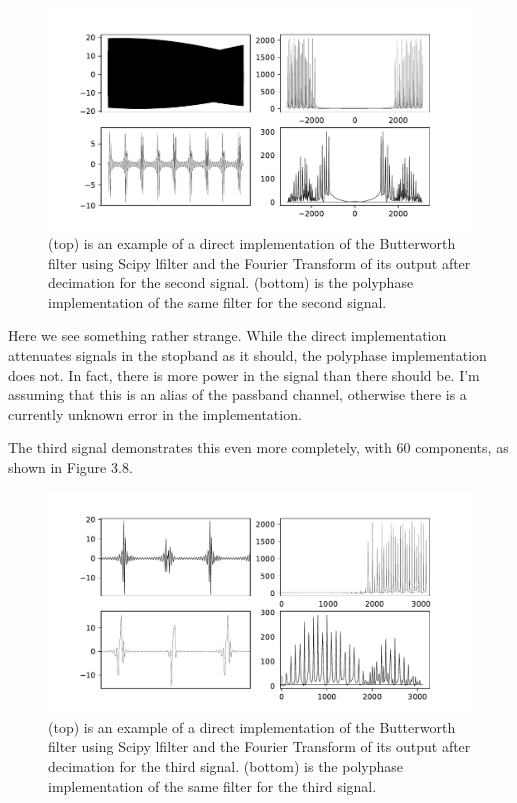 \documentclass{report}
\begin{document}
\begin{figure}[ht]
\includegraphics[scale=.55]{Figure_8.pdf}
\caption{(top) is an example of a direct implementation of the Butterworth filter using Scipy lfilter and the Fourier Transform of its output after decimation for the second signal. (bottom) is the polyphase implementation of the same filter for the second signal.}
\end{figure} 

Here we see something rather strange.  While the direct implementation attenuates signals in the stopband as it should, the polyphase implementation does not.  In fact, there is more power in the signal than there should be.  I'm assuming that this is an alias of the passband channel, otherwise there is a currently unknown error in the implementation.  

The third signal demonstrates this even more completely, with 60 components, as shown in Figure 3.8.

\begin{figure}[ht]
\includegraphics[scale=.55]{Figure_7.pdf}
\caption{(top) is an example of a direct implementation of the Butterworth filter using Scipy lfilter and the Fourier Transform of its output after decimation for the third signal. (bottom) is the polyphase implementation of the same filter for the third signal.}
\end{figure} 
\end{document}
